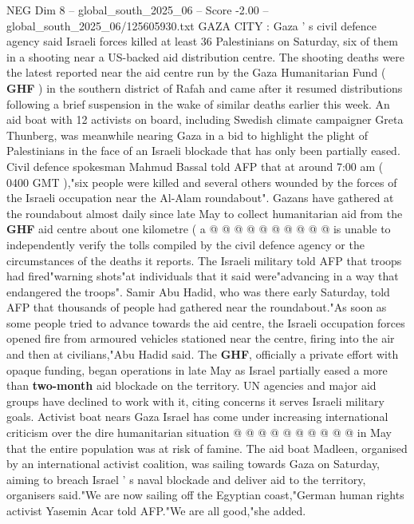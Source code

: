 \begin{textsample}{NEG Dim 8 – global\_south\_2025\_06 – Score -2.00 – global\_south\_2025\_06/125605930.txt}  \label{ex:f8_neg_037}
GAZA CITY : Gaza ' s civil defence agency said Israeli forces killed at least 36 Palestinians on Saturday, six of them in a shooting near a US-backed aid distribution centre.
The shooting deaths were the latest reported near the aid centre run by the Gaza Humanitarian Fund ( \textbf{GHF} ) in the southern district of Rafah and came after it resumed distributions following a brief suspension in the wake of similar deaths earlier this week.
An aid boat with 12 activists on board, including Swedish climate campaigner Greta Thunberg, was meanwhile nearing Gaza in a bid to highlight the plight of Palestinians in the face of an Israeli blockade that has only been partially eased.
Civil defence spokesman Mahmud Bassal told AFP that at around 7:00 am ( 0400 GMT ),"six people were killed and several others wounded by the forces of the Israeli occupation near the Al-Alam roundabout".
Gazans have gathered at the roundabout almost daily since late May to collect humanitarian aid from the \textbf{GHF} aid centre about one kilometre ( a @ @ @ @ @ @ @ @ @ @ is unable to independently verify the tolls compiled by the civil defence agency or the circumstances of the deaths it reports.
The Israeli military told AFP that troops had fired"warning shots"at individuals that it said were"advancing in a way that endangered the troops".
Samir Abu Hadid, who was there early Saturday, told AFP that thousands of people had gathered near the roundabout."As soon as some people tried to advance towards the aid centre, the Israeli occupation forces opened fire from armoured vehicles stationed near the centre, firing into the air and then at civilians,"Abu Hadid said.
The \textbf{GHF}, officially a private effort with opaque funding, began operations in late May as Israel partially eased a more than \textbf{two-month} aid blockade on the territory.
UN agencies and major aid groups have declined to work with it, citing concerns it serves Israeli military goals.
Activist boat nears Gaza Israel has come under increasing international criticism over the dire humanitarian situation @ @ @ @ @ @ @ @ @ @ in May that the entire population was at risk of famine.
The aid boat Madleen, organised by an international activist coalition, was sailing towards Gaza on Saturday, aiming to breach Israel ' s naval blockade and deliver aid to the territory, organisers said."We are now sailing off the Egyptian coast,"German human rights activist Yasemin Acar told AFP."We are all good,"she added.

\end{textsample}
